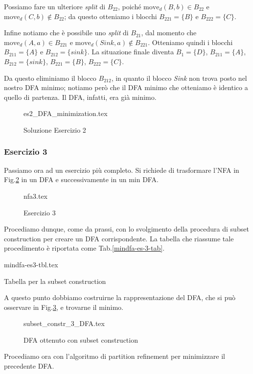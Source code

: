 \documentclass[class=book, crop=false, oneside, 12pt]{standalone}
\begin{document}
Possiamo fare un ulteriore \emph{split} di \(B_{22}\), poiché \(\textrm{move}_{d}(B,b) \in B_{22} \) e \(\textrm{move}_{d}(C,b) \notin B_{22} \); da questo otteniamo i blocchi \(B_{221}=\{B\}\) e \(B_{222}=\{C\}\).

Infine notiamo che è possibile uno \emph{split} di \(B_{21}\), dal momento che \(\textrm{move}_{d}(A,a) \in B_{221} \) e \(\textrm{move}_{d}(Sink,a) \notin B_{221} \). Otteniamo quindi i blocchi \(B_{211}=\{A\}\) e \(B_{212}=\{sink\}\).
La situazione finale diventa \(B_{1}=\{D\}\), \(B_{211}=\{A\}\), \(B_{212}=\{sink\}\), \(B_{221}=\{B\}\), \(B_{222}=\{C\}\).

Da questo eliminiamo il blocco \(B_{212}\), in quanto il blocco \emph{Sink} non trova posto nel nostro DFA minimo; notiamo però che il DFA minimo che otteniamo è identico a quello di partenza. Il DFA, infatti, era già minimo.  

\begin{figure}[H]
	\centering
    {es2_DFA_minimization.tex}
	\caption{Soluzione Esercizio 2}
  \label{mindfa-es-2-sol}
\end{figure}

\subsubsection{Esercizio 3}
Passiamo ora ad un esercizio più completo. Si richiede di trasformare l'NFA in Fig.\ref{mindfa-es-3} in un DFA e successivamente in un min DFA.
\begin{figure}[H]
	\centering
  {nfa3.tex}
	\caption{Esercizio 3}
	\label{mindfa-es-3}
\end{figure}
Procediamo dunque, come da prassi, con lo svolgimento della procedura di subset construction per creare un DFA corrispondente. La tabella che riassume tale procedimento è riportata come Tab.\ref{mindfa-es-3-tab}.
\begin{table}[H]
	\centering
	{mindfa-es3-tbl.tex}
	\caption{Tabella per la subset construction}
	\label{mindfa-es-3-tab}
\end{table}
A questo punto dobbiamo costruirne la rappresentazione del DFA, che si può osservare in Fig.\ref{dfa-sc-es-3-mindfa}, e trovarne il minimo.
\begin{figure}
	\centering
    {subset_constr_3_DFA.tex}
	\caption{DFA ottenuto con subset construction}
	\label{dfa-sc-es-3-mindfa}
\end{figure}
Procediamo ora con l’algoritmo di partition refinement per minimizzare il precedente DFA.
\end{document}
